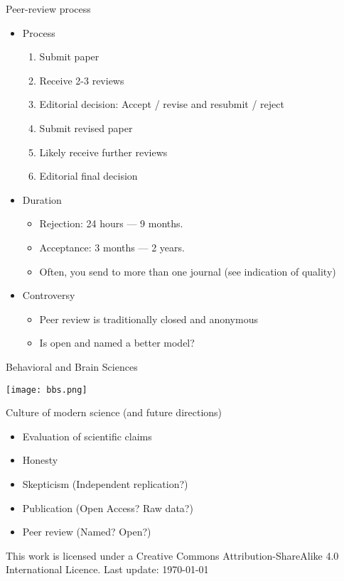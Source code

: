 \documentclass{beamer}
\begin{document}
\begin{frame}{Peer-review process}
	\begin{itemize}
		\item Process
		\begin{enumerate}
			\item Submit paper
			\item Receive 2-3 reviews
			\item Editorial decision: Accept / revise and resubmit / reject
			\item Submit revised paper
			\item Likely receive further reviews
			\item Editorial final decision
		\end{enumerate}
		\item Duration
		\begin{itemize}
			\item Rejection: 24 hours --- 9 months.
			\item Acceptance: 3 months --- 2 years. 
			\item Often, you send to more than one journal (see indication of quality)
		\end{itemize}
		\item Controversy
		\begin{itemize}
			\item Peer review is traditionally closed and anonymous
			\item Is open and named a better model?
		\end{itemize}
	\end{itemize}
\end{frame}

\begin{frame}{Behavioral and Brain Sciences}
	\centerline{\texttt{[image: bbs.png]}}
\end{frame}	

\begin{frame}{Culture of modern science (and future directions)}
	\begin{itemize}
		\item Evaluation of scientific claims
		\item Honesty
		\item Skepticism	(Independent replication?)
		\item Publication	 (Open Access? Raw data?)
		\item Peer review	 (Named? Open?) 
	\end{itemize}
	\vspace{12pt}

\tiny
This work is licensed under a Creative Commons Attribution-ShareAlike
4.0 International Licence. Last update: \today
	
\end{frame}
\end{document}
